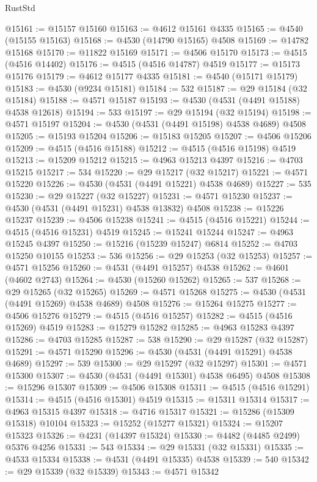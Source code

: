 \begin{lexlean}{RustStd}
\begin{coremodule}
@15161 := @15157 @15160
@15163 := @4612 @15161 @4335
@15165 := @4540 (@15155 @15163)
@15168 := @4530 (@14790 @15165) @4508
@15169 := @14782 @15168
@15170 := @11822 @15169
@15171 := @4506 @15170
@15173 := @4515 (@4516 @14402)
@15176 := @4515 (@4516 @14787) @4519
@15177 := @15173 @15176
@15179 := @4612 @15177 @4335
@15181 := @4540 (@15171 @15179)
@15183 := @4530 (@9234 @15181)
@15184 := 532
@15187 := @29 @15184 (@32 @15184)
@15188 := @4571 @15187
@15193 := @4530 (@4531 (@4491 @15188) @4538 @12618)
@15194 := 533
@15197 := @29 @15194 (@32 @15194)
@15198 := @4571 @15197
@15204 := @4530 (@4531 (@4491 @15198) @4538 @4689) @4508
@15205 := @15193 @15204
@15206 := @15183 @15205
@15207 := @4506 @15206
@15209 := @4515 (@4516 @15188)
@15212 := @4515 (@4516 @15198) @4519
@15213 := @15209 @15212
@15215 := @4963 @15213 @4397
@15216 := @4703 @15215
@15217 := 534
@15220 := @29 @15217 (@32 @15217)
@15221 := @4571 @15220
@15226 := @4530 (@4531 (@4491 @15221) @4538 @4689)
@15227 := 535
@15230 := @29 @15227 (@32 @15227)
@15231 := @4571 @15230
@15237 := @4530 (@4531 (@4491 @15231) @4538 @13832) @4508
@15238 := @15226 @15237
@15239 := @4506 @15238
@15241 := @4515 (@4516 @15221)
@15244 := @4515 (@4516 @15231) @4519
@15245 := @15241 @15244
@15247 := @4963 @15245 @4397
@15250 := @15216 (@15239 @15247) @6814
@15252 := @4703 @15250 @10155
@15253 := 536
@15256 := @29 @15253 (@32 @15253)
@15257 := @4571 @15256
@15260 := @4531 (@4491 @15257) @4538
@15262 := @4601 (@4602 @2743)
@15264 := @4530 (@15260 @15262)
@15265 := 537
@15268 := @29 @15265 (@32 @15265)
@15269 := @4571 @15268
@15275 := @4530 (@4531 (@4491 @15269) @4538 @4689) @4508
@15276 := @15264 @15275
@15277 := @4506 @15276
@15279 := @4515 (@4516 @15257)
@15282 := @4515 (@4516 @15269) @4519
@15283 := @15279 @15282
@15285 := @4963 @15283 @4397
@15286 := @4703 @15285
@15287 := 538
@15290 := @29 @15287 (@32 @15287)
@15291 := @4571 @15290
@15296 := @4530 (@4531 (@4491 @15291) @4538 @4689)
@15297 := 539
@15300 := @29 @15297 (@32 @15297)
@15301 := @4571 @15300
@15307 := @4530 (@4531 (@4491 @15301) @4538 @6495) @4508
@15308 := @15296 @15307
@15309 := @4506 @15308
@15311 := @4515 (@4516 @15291)
@15314 := @4515 (@4516 @15301) @4519
@15315 := @15311 @15314
@15317 := @4963 @15315 @4397
@15318 := @4716 @15317
@15321 := @15286 (@15309 @15318) @10104
@15323 := @15252 (@15277 @15321)
@15324 := @15207 @15323
@15326 := @4231 (@14397 @15324)
@15330 := @4482 (@4485 @2499) @5376 @4256
@15331 := 543
@15334 := @29 @15331 (@32 @15331)
@15335 := @4533 @15334
@15338 := @4531 (@4491 @15335) @4538
@15339 := 540
@15342 := @29 @15339 (@32 @15339)
@15343 := @4571 @15342

\end{coremodule}
\end{lexlean}
